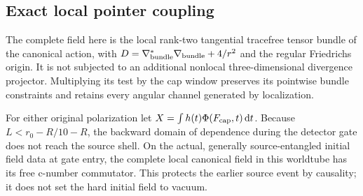 \subsection{Exact local pointer coupling}
The complete field here is the local rank-two tangential tracefree tensor
bundle of the canonical action, with
$D=\nabla_{\rm bundle}^*\nabla_{\rm bundle}+4/r^2$ and the regular
Friedrichs origin.  It is not subjected to an additional nonlocal
three-dimensional divergence projector.  Multiplying its test by the cap
window preserves its pointwise bundle constraints and retains every angular
channel generated by localization.

For either original polarization let
$X=\int h(t)\Phi(F_{\rm cap},t)\,\mathrm dt$.
Because $L<r_0-R/10-R$, the backward domain of dependence during the
detector gate does not reach the source shell.  On the actual, generally
source-entangled initial field data at gate entry, the complete local
canonical field in this worldtube has its free c-number commutator.
This protects the earlier source event by causality; it does not set the
hard initial field to vacuum.

